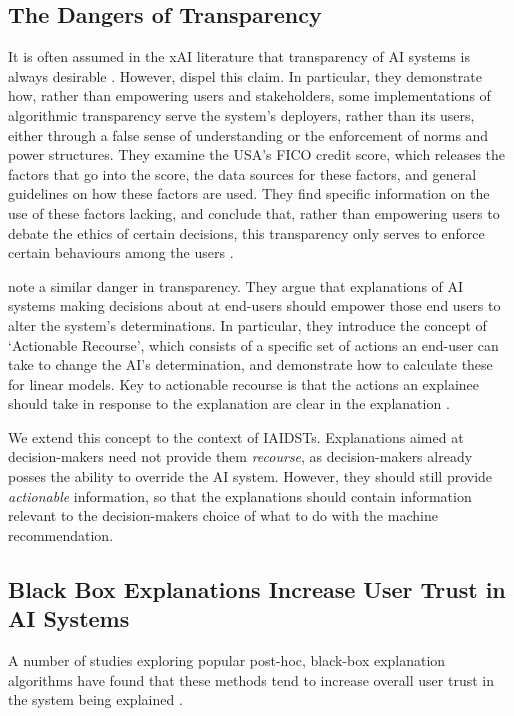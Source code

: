 \subsection{The Dangers of Transparency}
It is often assumed in the xAI literature that transparency of AI systems is always desirable \cite{molnar_interpretable_2019,miller_explanation_2017-1}. However, \textcite{wang_transparency_2022} dispel this claim. In particular, they demonstrate how, rather than empowering users and stakeholders, some implementations of algorithmic transparency serve the system's deployers, rather than its users, either through a false sense of understanding or the enforcement of norms and power structures. They examine the USA's FICO credit score, which releases the factors that go into the score, the data sources for these factors, and general guidelines on how these factors are used. They find specific information on the use of these factors lacking, and conclude that, rather than empowering users to debate the ethics of certain decisions, this transparency only serves to enforce certain behaviours among the users \cite{wang_transparency_2022}.

\textcite{ustun_actionable_2019} note a similar danger in transparency. They argue that explanations of AI systems making decisions about at end-users should empower those end users to alter the system's determinations. In particular, they introduce the concept of `Actionable Recourse', which consists of a specific set of actions an end-user can take to change the AI's determination, and demonstrate how to calculate these for linear models. Key to actionable recourse is that the actions an explainee should take in response to the explanation are clear in the explanation \cite{ustun_actionable_2019}.

We extend this concept to the context of IAIDSTs. Explanations aimed at decision-makers need not provide them \emph{recourse}, as decision-makers already posses the ability to override the AI system. However, they should still provide \emph{actionable} information, so that the explanations should contain information relevant to the decision-makers choice of what to do with the machine recommendation.

\subsection{Black Box Explanations Increase User Trust in AI Systems}
A number of studies exploring popular post-hoc, black-box explanation algorithms have found that these methods tend to increase overall user trust in the system being explained \cite{ford_play_2020,jacobs_how_2021,wang_transparency_2022}. 

